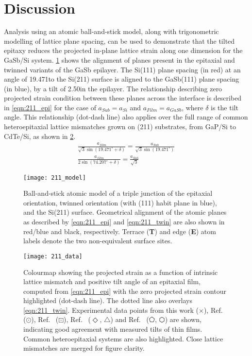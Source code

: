 \section{Discussion}
Analysis using an atomic ball-and-stick model, along with trigonometric modelling of lattice plane spacing, can be used to demonstrate that the tilted epitaxy reduces the projected in-plane lattice strain along one dimension for the GaSb/Si system. \cref{fig:211_model} shows the alignment of planes present in the epitaxial and twinned variants of the GaSb epilayer. The Si(111) plane spacing (in red) at an angle of 19.471\degree to the Si(211) surface is aligned to the GaSb(111) plane spacing (in blue), by a tilt of 2.50\degree in the epilayer. The relationship describing zero projected strain condition between these planes across the interface is described in \cref{eqn:211_epi} for the case of $a_{Sub} = a_{Si}$ and $a_{Film} = a_{GaSb}$, where $\delta$ is the tilt angle. This relationship (dot-dash line) also applies over the full range of common heteroepitaxial lattice mismatches grown on (211) substrates, from GaP/Si to CdTe/Si, as shown in \cref{fig:211_data}.
\begin{gather} 
 \frac{ a_{film}}{\sqrt{3} \sin(19.471^\circ + \delta)} = \frac{a_{Sub}}{\sqrt{3}\sin(19.471^\circ)} \label{eqn:211_epi}\\
 \frac{ a_{film}}{2\sin(74.207^\circ + \delta)} = \frac{ a_{Sub}}{\sqrt{3}}   \label{eqn:211_twin}
\end{gather}

\begin{figure}
    \centering
\texttt{[image: 211\_model]}
\caption[Atomic model of tilted thin film on 211 silicon]{\label{fig:211_model}Ball-and-stick atomic model of a triple junction of the epitaxial orientation, twinned orientation (with (111) habit plane in blue), and the Si(211) surface. Geometrical alignment of the atomic planes as described by \cref{eqn:211_epi} and \cref{eqn:211_twin} are also shown in red/blue and black, respectively. Terrace (\textbf{T}) and edge (\textbf{E}) atom labels denote the two non-equivalent surface sites.}
\end{figure}

\begin{figure}
    \centering
\texttt{[image: 211\_data]}
\caption[Colourmap of tilt and intrinsic lattice mismatch of thin films on 211 substrates]{\label{fig:211_data}Colourmap showing the projected strain as a function of 
intrinsic lattice mismatch and positive tilt angle of an epitaxial film, computed from 
\cref{eqn:211_epi} with the zero projected strain contour highlighted (dot-dash 
line). The dotted line also overlays \cref{eqn:211_twin}. Experimental data points 
from this work ($\times$), Ref.~ ($\odot$), Ref.~ 
($\boxdot$), Ref.~ ($\Diamond$, $\bigtriangleup$) and 
Ref.~ ($\pentagon$, $\varhexagon$) are shown, 
indicating good agreement with measured tilts of thin films. Common heteroepitaxial 
systems are also highlighted. Close lattice mismatches are merged for figure clarity.}
\end{figure}

